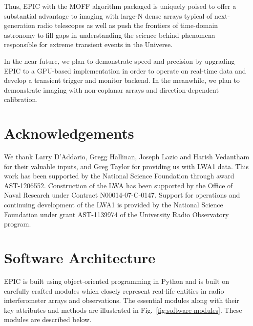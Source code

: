 \documentclass[a4paper,fleqn,usenatbib]{mnras}
\begin{document}
Thus, EPIC with the MOFF algorithm packaged is uniquely poised to offer a substantial advantage to imaging with large-N dense arrays typical of next-generation radio telescopes as well as push the frontiers of time-domain astronomy to fill gaps in understanding the science behind phenomena responsible for extreme transient events in the Universe.

In the near future, we plan to demonstrate speed and precision by upgrading EPIC to a GPU-based implementation in order to operate on real-time data and develop a transient trigger and monitor backend. In the meanwhile, we plan to demonstrate imaging with non-coplanar arrays and direction-dependent calibration.

\section*{Acknowledgements}

We thank Larry D'Addario, Gregg Hallinan, Joseph Lazio and Harish Vedantham for their valuable inputs, and Greg Taylor for providing us with LWA1 data. This work has been supported by the National Science Foundation through award AST-1206552. Construction of the LWA has been supported by the Office of Naval Research under Contract N00014-07-C-0147. Support for operations and continuing development of the LWA1 is provided by the National Science Foundation under grant AST-1139974 of the University Radio Observatory program.



%  
%  



\appendix

\section{Software Architecture}\label{sec:software-modules}

EPIC is built using object-oriented programming in Python and is built on carefully crafted modules which closely represent real-life entities in radio interferometer arrays and observations. The essential modules along with their key attributes and methods are illustrated in Fig.~\ref{fig:software-modules}. These modules are described below.
\end{document}
